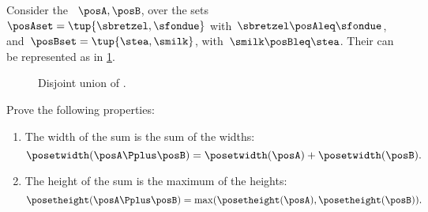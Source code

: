\begin{example}
    Consider the ~$\posA,\posB$, over the sets~$\posAset=\tup{\sbretzel, \sfondue}$ with~$\sbretzel \posAleq \sfondue$, and~$\posBset=\tup{\stea,\smilk}$, with~$\smilk \posBleq \stea$.
    Their  can be represented as in \cref{fig:poset-coproduct}.
    \begin{figure}[h!]
        \centering
        \caption{Disjoint union of .}
        \label{fig:poset-coproduct}
    \end{figure}
\end{example}
\vfill
\begin{gradedexercise}
    \label{ex:MeasurePosetSum}
    Prove the following properties:
    \begin{enumerate}
        \item The width of the sum is the sum of the widths:
              \begin{equation}\label{eq:MeasurePosetSum-1}
                  \posetwidth(\posA \Pplus \posB) = \posetwidth(\posA) + \posetwidth(\posB).
              \end{equation}
        \item The height of the sum is the maximum of the heights:
              \begin{equation}\label{eq:MeasurePosetSum-2}
                  \posetheight(\posA \Pplus \posB) = \max(\posetheight(\posA), \posetheight(\posB)).
              \end{equation}
    \end{enumerate}
\end{gradedexercise}
